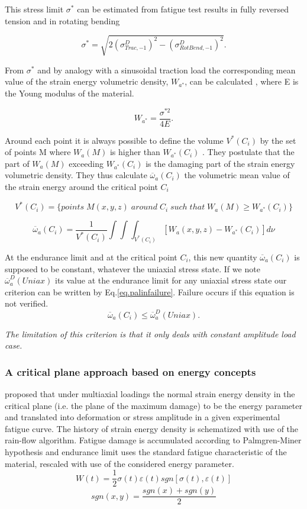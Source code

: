 This stress limit $\sigma^*$ can be estimated from
fatigue test results in fully reversed tension and in rotating
bending

$$\sigma^*=\sqrt{2(\sigma_{Trac,-1}^D)^2-(\sigma_{RotBend,-1}^D)^2}.$$

From $\sigma^*$ and by analogy with a sinusoidal traction load the corresponding mean value
of the strain energy volumetric density, $W_{a^*}$, can be calculated , where E is the
Young modulus of the material.

$$W_{a^*}=\frac{\sigma^{*2}}{4E}.$$

Around each point it is always possible to define
the volume $V^* (C_i)$ by the set of points M where $W_a (M)$ is higher than $W_{a^*} (C_i)$
. They postulate that the part of $W_a (M)$ exceeding $W_{a^*} (C_i)$ is the damaging part
of the strain energy volumetric density. They thus calculate $\overline{\omega}_a(C_i)$ 
the volumetric mean value of the strain energy around the critical point $C_i$

$$V^*(C_i)=\lbrace points\; M(x,y,z) \;around\; C_i \;such\; that \;W_a(M)\geqslant W_{a^*}(C_i) \rbrace$$

$$\overline{\omega}_a(C_i)=\frac{1}{V^*(C_i)}\int\int\int_{V^*(C_i)}^{}[W_a(x,y,z)-W_{a^*}(C_i)]d\nu$$

At the endurance limit and at the critical point $C_i$, this new quantity $\overline{\omega}_a(C_i)$ is
supposed to be constant, whatever the uniaxial stress state. If we note $\overline{\omega}_a^D(Uniax)$ its
value at the endurance limit for any uniaxial stress state our criterion can be written by
Eq.\eqref{eq.palinfailure}. Failure occurs if this equation is not verified.
\begin{equation}
\overline{\omega}_a(C_i)\leqslant\overline{\omega}_a^D(Uniax).
\label{eq.palinfailure}
\end{equation}

\textit{The limitation of this criterion is that it only deals with constant amplitude load case.}

\subsubsection{A critical plane approach based on energy concepts}


\cite{lagoda1999critical} proposed that under multiaxial loadings the normal strain energy density in the critical plane (i.e. the plane of the maximum damage) to be the energy parameter and translated into deformation or stress amplitude in a given experimental fatigue curve. The history of strain energy density is schematized with use of the rain-flow algorithm. %
Fatigue damage is accumulated according to Palmgren-Miner hypothesis and endurance limit uses the standard fatigue characteristic of the material, rescaled with use of the considered energy parameter. 
\begin{equation}W(t)=\frac{1}{2}\sigma(t)\varepsilon(t)sgn[\sigma(t),\varepsilon(t)]\label{eq.lagodaWt}
\end{equation}
$$sgn(x,y)=\frac{sgn(x)+sgn(y)}{2}$$

